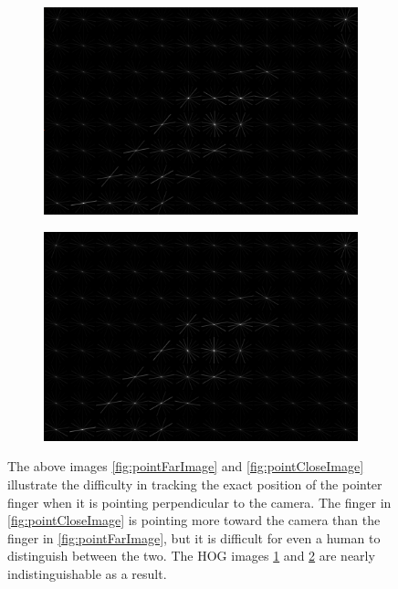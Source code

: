 \documentclass[10pt,twocolumn,letterpaper]{article}
\begin{document}
\begin{center}
\begin{figure}[b]
\begin{center}
		\begin{subfigure}[b]{0.3\textwidth}
			\includegraphics[width=\textwidth]{figures/PointFarHOG.png}
			\caption{}
			\label{fig:pointFarHog}
		\end{subfigure}
		\begin{subfigure}[b]{0.3\textwidth}
			\includegraphics[width=\textwidth]{figures/PointCloseHOG.png}
			\caption{}
			\label{fig:pointCloseHog}
		\end{subfigure}
	\end{center}
	\caption{The above images \ref{fig:pointFarImage} and \ref{fig:pointCloseImage} illustrate the difficulty in tracking the exact position of the pointer finger when it is pointing perpendicular to the camera. The finger in \ref{fig:pointCloseImage} is pointing more toward the camera than the finger in \ref{fig:pointFarImage}, but it is difficult for even a human to distinguish between the two. The HOG images \ref{fig:pointFarHog} and \ref{fig:pointCloseHog} are nearly indistinguishable as a result.}
	\label{fig:close}
\end{figure}
\end{center}
\FloatBarrier
\end{document}
